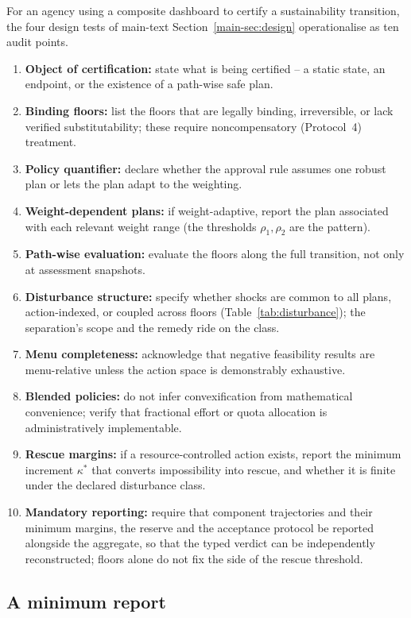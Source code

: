 \documentclass[preprint,11pt,authoryear]{elsarticle}
\theoremstyle{remark}
\begin{document}
For an agency using a composite dashboard to certify a sustainability transition, the four design tests of main-text Section~\ref{main-sec:design} operationalise as ten audit points.
\begin{enumerate}[leftmargin=2em]
\item \textbf{Object of certification:} state what is being certified -- a static state, an endpoint, or the existence of a path-wise safe plan.
\item \textbf{Binding floors:} list the floors that are legally binding, irreversible, or lack verified substitutability; these require noncompensatory (Protocol~4) treatment.
\item \textbf{Policy quantifier:} declare whether the approval rule assumes one robust plan or lets the plan adapt to the weighting.
\item \textbf{Weight-dependent plans:} if weight-adaptive, report the plan associated with each relevant weight range (the thresholds $\rho_1,\rho_2$ are the pattern).
\item \textbf{Path-wise evaluation:} evaluate the floors along the full transition, not only at assessment snapshots.
\item \textbf{Disturbance structure:} specify whether shocks are common to all plans, action-indexed, or coupled across floors (Table~\ref{tab:disturbance}); the separation's scope and the remedy ride on the class.
\item \textbf{Menu completeness:} acknowledge that negative feasibility results are menu-relative unless the action space is demonstrably exhaustive.
\item \textbf{Blended policies:} do not infer convexification from mathematical convenience; verify that fractional effort or quota allocation is administratively implementable.
\item \textbf{Rescue margins:} if a resource-controlled action exists, report the minimum increment $\kappa^*$ that converts impossibility into rescue, and whether it is finite under the declared disturbance class.
\item \textbf{Mandatory reporting:} require that component trajectories and their minimum margins, the reserve and the acceptance protocol be reported alongside the aggregate, so that the typed verdict can be independently reconstructed; floors alone do not fix the side of the rescue threshold.
\end{enumerate}

\subsection{A minimum report}
\end{document}
